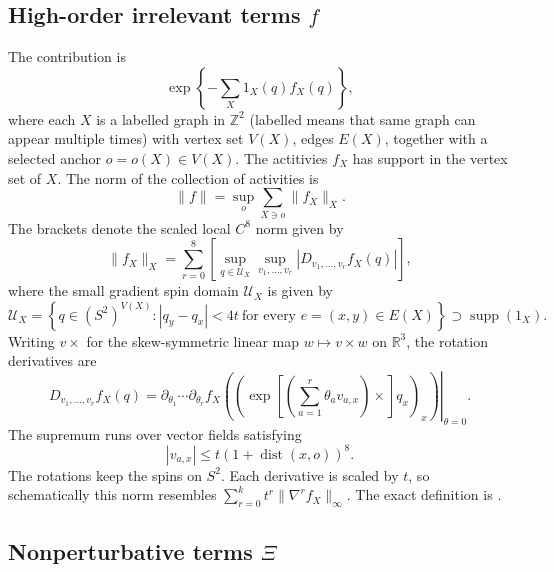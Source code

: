 \documentclass[11pt]{article}
\newcommand{\R}{\mathbb R}
\newcommand{\Z}{\mathbb Z}
\numberwithin{equation}{section}
\theoremstyle{definition}
\theoremstyle{plain}
\begin{document}
\subsection{High-order irrelevant terms $f$}

The contribution is
\begin{equation}
  \exp\left\{-\sum_X 1_X(q) f_X(q) \right\},
\end{equation}
where each $X$ is a labelled graph in $\Z^2$ (labelled means that same graph can appear multiple times)
with vertex set $V(X)$, edges $E(X)$, together with a selected anchor $o = o(X) \in V(X)$.
%
The actitivies $f_X$ has support in the vertex set of $X$. The norm of
the collection of activities is
\begin{equation}
  \|f\| = \sup_o \sum_{X \ni o} \|f_X\|_X.
\end{equation}
The brackets denote the scaled local $C^8$ norm given by
\begin{equation}
 \|f_X\|_X
 =\sum_{r=0}^{8}
 \left[
   \sup_{q\in\mathcal U_{X}}
   \sup_{v_1,\ldots,v_r}
   |D_{v_1,\ldots,v_r}f_X(q)|
   \right],
 \label{eq:error-seminorm}
\end{equation}
where the small gradient spin domain $\mathcal U_X$ is given by
\begin{equation}
 \mathcal U_X
 =\left\{q\in(S^2)^{V(X)}:
       |q_y-q_x|<4t\ \text{for every }e=(x,y)\in E(X)\right\} \supset \operatorname{supp}(1_X).
 \label{eq:error-graph-domain}
\end{equation}
Writing $v\times$ for the skew-symmetric linear map
$w\mapsto v\times w$ on $\R^3$, the rotation derivatives are
\begin{equation}
 D_{v_1,\ldots,v_r}f_X(q)
 =\left.
   \partial_{\theta_1}\cdots\partial_{\theta_r}
   f_X\!\left(\left(
     \exp\!\left[\left(\sum_{a=1}^{r}\theta_av_{a,x}\right)
                      \times\right]q_x
   \right)_x\right)
   \right|_{\theta=0}.
 \label{eq:error-rotation-jets}
\end{equation}
The supremum runs over vector fields satisfying
\begin{equation}
 |v_{a,x}|\le t(1+\operatorname{dist}(x,o))^8.
 \label{eq:error-directions}
\end{equation}
The rotations keep the spins on $S^2$.
Each derivative is scaled by $t$, so schematically this norm resembles
$\sum_{r=0}^k t^r\|\nabla^r f_X\|_\infty$.
The exact definition is \cite[(3.20)--(3.22)]{OpenAI-O3}.

\subsection{Nonperturbative terms $\Xi$}
\end{document}
